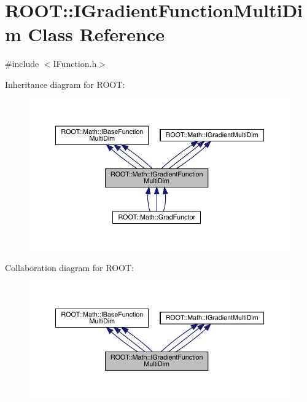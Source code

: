\hypertarget{classROOT_1_1Math_1_1IGradientFunctionMultiDim}{}\section{R\+O\+OT\+:\+:I\+Gradient\+Function\+Multi\+Dim Class Reference}
\label{classROOT_1_1Math_1_1IGradientFunctionMultiDim}


{\ttfamily \#include $<$I\+Function.\+h$>$}



Inheritance diagram for R\+O\+OT\+:
\nopagebreak
\begin{figure}[H]
\begin{center}
\leavevmode
\includegraphics[width=350pt]{d9/dbf/classROOT_1_1Math_1_1IGradientFunctionMultiDim__inherit__graph}
\end{center}
\end{figure}


Collaboration diagram for R\+O\+OT\+:
\nopagebreak
\begin{figure}[H]
\begin{center}
\leavevmode
\includegraphics[width=350pt]{d1/dda/classROOT_1_1Math_1_1IGradientFunctionMultiDim__coll__graph}
\end{center}
\end{figure}

